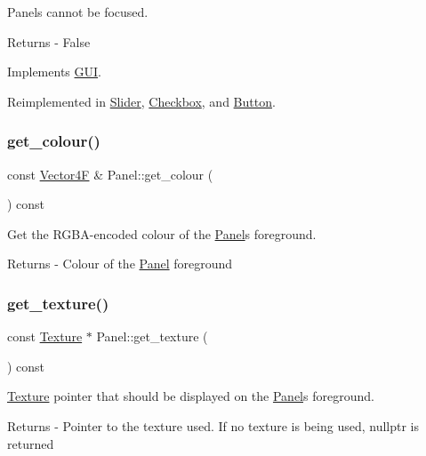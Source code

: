 Panels cannot be focused. \begin{DoxyReturn}{Returns}
-\/ False 
\end{DoxyReturn}


Implements \mbox{\hyperlink{class_g_u_i_ad2a7c1ae3938ba1d6dea0142f16d6c2b}{G\+UI}}.



Reimplemented in \mbox{\hyperlink{class_slider_a30b01348a5d214f3078e22516c60a763}{Slider}}, \mbox{\hyperlink{class_checkbox_a2a2c82a9e8c95ad868ce85a60ba07292}{Checkbox}}, and \mbox{\hyperlink{class_button_a2c1b0adeb2920b394fe4f38354ae6604}{Button}}.

\mbox{\label{class_panel_ace1342ef6e7c0f73a44e380356ce5e28}} 
\subsubsection{\texorpdfstring{get\+\_\+colour()}{get\_colour()}}
{\footnotesize\ttfamily const \mbox{\hyperlink{class_vector4}{Vector4F}} \& Panel\+::get\+\_\+colour (\begin{DoxyParamCaption}{ }\end{DoxyParamCaption}) const}

Get the R\+G\+B\+A-\/encoded colour of the \mbox{\hyperlink{class_panel}{Panel}}\textquotesingle{}s foreground. \begin{DoxyReturn}{Returns}
-\/ Colour of the \mbox{\hyperlink{class_panel}{Panel}} foreground 
\end{DoxyReturn}
\mbox{\label{class_panel_a938f8a6b4038c5ebd43468ff7c6279c6}} 
\subsubsection{\texorpdfstring{get\+\_\+texture()}{get\_texture()}}
{\footnotesize\ttfamily const \mbox{\hyperlink{class_texture}{Texture}} $\ast$ Panel\+::get\+\_\+texture (\begin{DoxyParamCaption}{ }\end{DoxyParamCaption}) const}

\mbox{\hyperlink{class_texture}{Texture}} pointer that should be displayed on the \mbox{\hyperlink{class_panel}{Panel}}\textquotesingle{}s foreground. \begin{DoxyReturn}{Returns}
-\/ Pointer to the texture used. If no texture is being used, nullptr is returned 
\end{DoxyReturn}
\mbox{\label{class_panel_a3df9165a8d21073e92090937122a790b}} 
